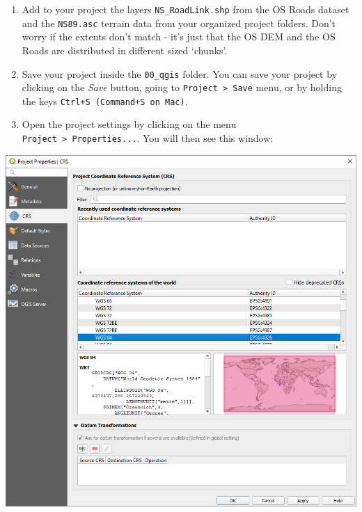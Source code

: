 \documentclass[
  letterpaper,
  DIV=11,
  numbers=noendperiod]{scrreprt}
\begin{document}
\begin{enumerate}
\def\labelenumi{(\arabic{enumi})}
\setcounter{enumi}{8}
\item
  Add to your project the layers \texttt{NS\_RoadLink.shp} from the OS
  Roads dataset and the \texttt{NS89.asc} terrain data from your
  organized project folders. Don't worry if the extents don't match -
  it's just that the OS DEM and the OS Roads are distributed in
  different sized `chunks'.
\item
  Save your project inside the \texttt{00\_qgis} folder. You can save
  your project by clicking on the \emph{Save} button, going to
  \texttt{Project\ \textgreater{}\ Save} menu, or by holding the keys
  \texttt{Ctrl+S\ (Command+S\ on\ Mac)}.
\item
  Open the project settings by clicking on the menu
  \texttt{Project\ \textgreater{}\ Properties...}. You will then see
  this window:
\end{enumerate}

\includegraphics{images/lab_1/lab1_fig2_projprops.png}
\end{document}
